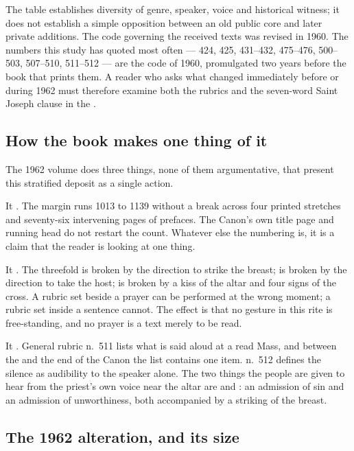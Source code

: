 The table establishes diversity of genre, speaker, voice and historical
witness; it does not establish a simple opposition between an old public core
and later private additions. The code governing the received texts was revised
in 1960. The numbers this study has quoted most often ---
424, 425, 431--432, 475--476, 500--503, 507--510, 511--512 --- are the code of
1960, promulgated two years before the book that prints them. A reader who
asks what changed immediately before or during 1962 must therefore examine both
the rubrics and the seven-word Saint Joseph clause in the
.

\subsection*{How the book makes one thing of it}

The 1962 volume does three things, none of them argumentative, that present
this stratified deposit as a single action.

It . The margin runs 1013 to 1139 without a break
across four printed stretches and seventy-six intervening pages of prefaces.
The Canon's own title page and running head do not restart the count. Whatever
else the numbering is, it is a claim that the reader is looking at one thing.

It . The threefold 
is broken by the direction to strike the breast;  is broken by the direction to take the host;  is broken by a kiss of the altar and four signs of the cross. A rubric
set beside a prayer can be performed at the wrong moment; a rubric set inside a
sentence cannot. The effect is that no gesture in this rite is free-standing,
and no prayer is a text merely to be read.

It . General rubric n.~511 lists what is said
aloud at a read Mass, and between the  and the end of the
Canon the list contains one item. n.~512 defines the silence as audibility to
the speaker alone. The two things the people are given to hear from the
priest's own voice near the altar are  and
: an admission of sin and an admission of
unworthiness, both accompanied by a striking of the breast.

\subsection*{The 1962 alteration, and its size}

